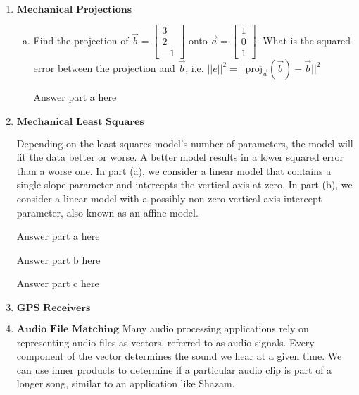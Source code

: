 \documentclass[11pt]{article}
\def\proj{\text{proj}}
\begin{document}
\begin{enumerate}
	\newpage
	\item $\textbf{Mechanical Projections}$
	      \begin{enumerate}[(a)]
	      	\item Find the projection of $\vec b = \begin{bmatrix} 3 \\ 2 \\ -1 \end{bmatrix}$ onto $\vec a = \begin{bmatrix} 1 \\ 0 \\ 1 \end{bmatrix}$. What is the squared error between the projection and $\vec b$, i.e. $||e||^2 = ||\proj_{\vec a}(\vec b)-\vec b||^2$
  		      \begin{Answer}
  		      	Answer part a here
  		      \end{Answer}
	      \end{enumerate}
	      	      	      
	\newpage
	\item $\textbf{Mechanical Least Squares}$
	
	Depending on the least squares model’s number of parameters, the model will fit the data better or worse. A better model results in a lower squared error than a worse one. In part (a), we consider a linear model that contains a single slope parameter and intercepts the vertical axis at zero. In part (b), we consider a linear model with a possibly non-zero vertical axis intercept parameter, also known as an affine model.
	
        \begin{Answer}
        	Answer part a here
        \end{Answer}


        \begin{Answer}
        	Answer part b here
        \end{Answer}

        \begin{Answer}
        	Answer part c here
        \end{Answer}


\newpage
\item $\textbf{GPS Receivers}$
% 

\newpage
\item $\textbf{Audio File Matching}$
	Many audio processing applications rely on representing audio files as vectors, referred to as audio signals.
	Every component of the vector determines the sound we hear at a given time. We can use inner products to determine if a particular audio clip is part of a longer song, similar to an application like Shazam. 
	

\end{enumerate}
\end{document}
